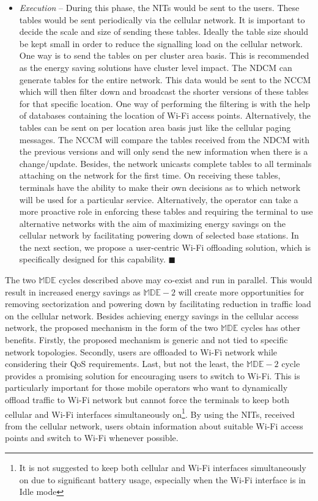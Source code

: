 \documentclass[journal]{IEEEtran}
\begin{document}
\begin{itemize}
\item \emph{Execution} -- During this phase, the NITs would be sent to the users. These tables would be sent periodically via the cellular network. It is important to decide the scale and size of sending these tables. Ideally the table size should be kept small in order to reduce the signalling load on the cellular network. One way is to send the tables on per cluster area basis. This is recommended as the energy saving solutions have cluster level impact. The NDCM can generate tables for the entire network. This data would be sent to the NCCM which will then filter down and broadcast the shorter versions of these tables for that specific location. One way of performing the filtering is with the help of databases containing the location of Wi-Fi access points. Alternatively, the tables can be sent on per location area basis just like the cellular paging messages. The NCCM will compare the tables received from the NDCM with the previous versions and will only send the new information when there is a change/update. Besides, the network unicasts complete tables to all terminals attaching on the network for the first time. On receiving these tables, terminals have the ability to make their own decisions as to which network will be used for a particular service. Alternatively, the operator can take a more proactive role in enforcing these tables and requiring the terminal to use alternative networks with the aim of maximizing energy savings on the cellular network by facilitating powering down of selected base stations. In the next section, we propose a user-centric Wi-Fi offloading solution, which is specifically designed for this capability.  $\blacksquare$






\end{itemize}

The two $\mathbb{MDE}$ cycles described above may co-exist and run in parallel. This would result in increased energy savings as $\mathbb{MDE}-2$ will create more opportunities for removing sectorization and powering down by facilitating reduction in traffic load on the cellular network.  Besides achieving energy savings in the cellular access network, the proposed mechanism in the form of the two $\mathbb{MDE}$ cycles has other benefits. Firstly, the proposed mechanism is generic and not tied to specific network topologies. Secondly, users are offloaded to Wi-Fi network while considering their QoS requirements. Last, but not the least, the $\mathbb{MDE}-2$ cycle provides a promising solution for  encouraging users to switch to Wi-Fi. This is particularly important for those mobile operators who want to dynamically offload traffic to Wi-Fi network but cannot force the terminals to keep both cellular and Wi-Fi interfaces simultaneously on\footnote{It is not suggested to keep both cellular and Wi-Fi interfaces simultaneously on due to significant battery usage, especially when the Wi-Fi interface is in Idle mode}. By using the NITs, received from the cellular network, users obtain information about suitable Wi-Fi access points and switch to Wi-Fi whenever possible. 
\end{document}
